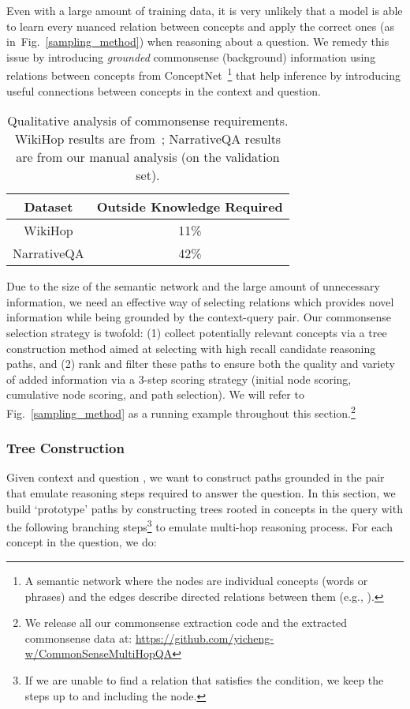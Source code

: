 \documentclass[11pt,a4paper]{article}
\def\figref#1{Fig.~\ref{#1}}
\begin{document}
Even with a large amount of training data, it is very unlikely that a model is able to learn every nuanced relation between concepts and apply the correct ones (as in~\figref{sampling_method}) when reasoning about a question.
We remedy this issue by introducing {\it grounded} commonsense (background) information using relations between concepts from ConceptNet~\cite{speer2012representing}\footnote
{A semantic network where the nodes are individual concepts (words or phrases) and the edges describe directed relations between them (e.g., ).} that help inference by introducing useful connections between concepts in the context and question.



\begin{table}[t]
    \centering
    \begin{small}
    \begin{tabular}{cc}\toprule
    \textbf{Dataset} & \textbf{Outside Knowledge Required} \\
    \midrule
	WikiHop & 11\% \\
    NarrativeQA & 42\% \\
    \bottomrule
    \end{tabular}
    \end{small}
    \caption{Qualitative analysis of commonsense requirements. WikiHop results are from~; NarrativeQA results are from our manual analysis (on the validation set).}
    \label{tab:commonsense_req}
    \vspace{-10pt}
\end{table}
 
Due to the size of the semantic network and the large amount of unnecessary information, we need an effective way of selecting relations which provides novel information while being grounded by the context-query pair. Our commonsense selection strategy is twofold: (1) collect potentially relevant concepts via a tree construction method aimed at selecting with high recall candidate reasoning paths, and (2) rank and filter these paths to ensure both the quality and variety of added information via a 3-step scoring strategy (initial node scoring, cumulative node scoring, and path selection).  We will refer to \figref{sampling_method} as a running example throughout this section.\footnote{We release all our commonsense extraction code and the extracted commonsense data at: \scriptsize{\url{https://github.com/yicheng-w/CommonSenseMultiHopQA}}}

\subsubsection{Tree Construction}
Given context  and question ,
we want to construct paths grounded in the pair that emulate reasoning steps required to answer the question.
In this section, we build `prototype' paths by constructing trees rooted in concepts in the query with the following branching steps\footnote{If we are unable to find a relation that satisfies the condition, we keep the steps up to and including the node.} to emulate multi-hop reasoning process. For each concept  in the question, we do: 
\end{document}

